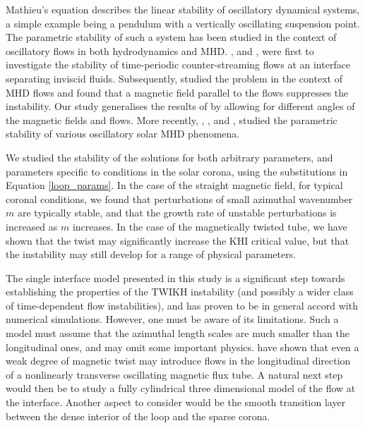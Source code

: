 \documentclass[12pt]{ociamthesis}
\begin{document}
Mathieu's equation describes the linear stability of oscillatory dynamical systems, a simple example being a pendulum with a vertically oscillating suspension point.
The parametric stability of such a system has been studied in the context of oscillatory flows in both hydrodynamics and MHD.
\cite{Greenspan1963}, and \cite{Kelly1965}, were first to investigate the stability of time-periodic counter-streaming flows at an interface separating inviscid fluids.
Subsequently, \cite{Roberts1973} studied the problem in the context of MHD flows and found that a magnetic field parallel to the flows suppresses the instability.
Our study generalises the results of \cite{Roberts1973} by allowing for different angles of the magnetic fields and flows.
More recently, \cite{Zaqarashvili2000}, \cite{Zaqarashvili2002}, and \cite{Zaqarashvili2005}, studied the parametric stability of various oscillatory solar MHD phenomena.

We studied the stability of the solutions for both arbitrary parameters, and parameters specific to conditions in the solar corona, using the substitutions in Equation \eqref{loop_params}.
In the case of the straight magnetic field, for typical coronal conditions, we found that perturbations of small azimuthal wavenumber $m$ are typically stable, and that the growth rate of unstable perturbations is increased as $m$ increases.
In the case of the magnetically twisted tube, we have shown that the twist may significantly increase the KHI critical value, but that the instability may still develop for a range of physical parameters.

The single interface model presented in this study is a significant step towards establishing the properties of the TWIKH instability (and possibly a wider class of time-dependent flow instabilities), and has proven to be in general accord with numerical simulations.
However, one must be aware of its limitations.
Such a model must assume that the azimuthal length scales are much smaller than the longitudinal ones, and may omit some important physics.
\cite{Howson2017a} have shown that even a weak degree of magnetic twist may introduce flows in the longitudinal direction of a nonlinearly transverse oscillating magnetic flux tube.
A natural next step would then be to study a fully cylindrical three dimensional model of the flow at the interface.
Another aspect to consider would be the smooth transition layer between the dense interior of the loop and the sparse corona.



  
\end{document}
